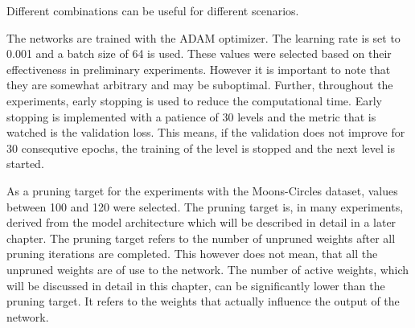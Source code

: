 Different combinations can be useful for different scenarios.

The networks are trained with the ADAM optimizer.
The learning rate is set to 0.001 and a batch size of 64 is used.
These values were selected based on their effectiveness in preliminary experiments. However it is important to note that they are somewhat arbitrary and may be suboptimal.
Further, throughout the experiments, early stopping is used to reduce the computational time.
Early stopping is implemented with a patience of 30 levels and the metric that is watched is the validation loss.
This means, if the validation does not improve for 30 consequtive epochs, the training of the level is stopped and the next level is started.

As a pruning target for the experiments with the Moons-Circles dataset, values between 100 and 120 were selected.
The pruning target is, in many experiments, derived from the model architecture which will be described in detail in a later chapter.
The pruning target refers to the number of unpruned weights after all pruning iterations are completed.
This however does not mean, that all the unpruned weights are of use to the network.
The number of active weights, which will be discussed in detail in this chapter, can be significantly lower than the pruning target.
It refers to the weights that actually influence the output of the network.

